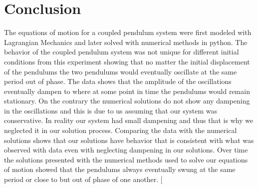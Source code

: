\documentclass[twocolumn]{article}
\begin{document}
\section*{Conclusion}
The equations of motion for a coupled pendulum system were first modeled with Lagrangian Mechanics and later solved with numerical methods in python. The behavior of the coupled pendulum system was not unique for different initial conditions from this experiment showing that no matter the initial displacement of the pendulums the two pendulums would eventually oscillate at the same period out of phase. The data shows that the amplitude of the oscillations eventually dampen to where at some point in time the pendulums would remain stationary. On the contrary the numerical solutions do not show any dampening in the oscillations and this is due to us assuming that our system was conservative. In reality our system had small dampening and thus that is why we neglected it in our solution process. Comparing the data with the numerical solutions shows that our solutions have behavior that is consistent with what was observed with data even with neglecting dampening in our solutions. Over time the solutions presented with the numerical methods used to solve our equations of motion showed that the pendulums always eventually swung at the same period or close to but out of phase of one another.
\clearpage
\twocolumn[
\end{document}
